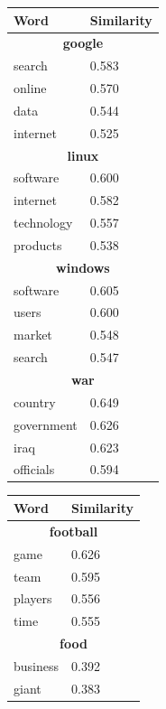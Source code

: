 \begin{table}[h]
	\centering
	\begin{minipage}{0.45\linewidth}
		\begin{tabular}{ll}
			\toprule
			\textbf{Word} & \textbf{Similarity} \\
			\midrule
			\multicolumn{2}{c}{\textbf{google}} \\
			\midrule
			search & 0.583 \\
			online & 0.570 \\
			data & 0.544 \\
			internet & 0.525 \\
			\bottomrule
			\multicolumn{2}{c}{\textbf{linux}} \\
			\midrule
			software & 0.600 \\
			internet & 0.582 \\
			technology & 0.557 \\
			products & 0.538 \\
			\bottomrule
			\multicolumn{2}{c}{\textbf{windows}} \\
			\midrule
			software & 0.605 \\
			users & 0.600 \\
			market & 0.548 \\
			search & 0.547 \\
			\bottomrule
			\multicolumn{2}{c}{\textbf{war}} \\
			\midrule
			country & 0.649 \\
			government & 0.626 \\
			iraq & 0.623 \\
			officials & 0.594 \\
			\bottomrule
		\end{tabular}
	\end{minipage}\begin{minipage}{0.45\linewidth}
		\begin{tabular}{ll}
			\toprule
			\textbf{Word} & \textbf{Similarity} \\
			\midrule
			\multicolumn{2}{c}{\textbf{football}} \\
			\midrule
			game & 0.626 \\
			team & 0.595 \\
			players & 0.556 \\
			time & 0.555 \\
			\bottomrule
			\multicolumn{2}{c}{\textbf{food}} \\
			\midrule
			business & 0.392 \\
			giant & 0.383 \\

\end{tabular}
\end{minipage}
\end{table}
